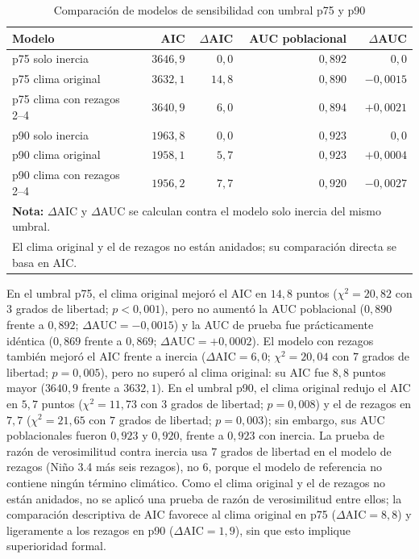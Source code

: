 \documentclass[11pt,a4paper]{article}
\begin{document}
\begin{table}[htbp]
	\centering
	\small
	\caption{Comparación de modelos de sensibilidad con umbral p75 y p90}
	\label{tab:sens_modelos}
	\begin{tabular}{lrrrr}
		\toprule
		\textbf{Modelo} & \textbf{AIC} & \textbf{$\Delta$AIC} & \textbf{AUC poblacional} & \textbf{$\Delta$AUC} \\
		\midrule
		p75 solo inercia & $3646{,}9$ & $0{,}0$ & $0{,}892$ & $0{,}0$ \\
		p75 clima original & $3632{,}1$ & $14{,}8$ & $0{,}890$ & $-0{,}0015$ \\
		p75 clima con rezagos 2--4 & $3640{,}9$ & $6{,}0$ & $0{,}894$ & $+0{,}0021$ \\
		\midrule
		p90 solo inercia & $1963{,}8$ & $0{,}0$ & $0{,}923$ & $0{,}0$ \\
		p90 clima original & $1958{,}1$ & $5{,}7$ & $0{,}923$ & $+0{,}0004$ \\
		p90 clima con rezagos 2--4 & $1956{,}2$ & $7{,}7$ & $0{,}920$ & $-0{,}0027$ \\
		\midrule
		\multicolumn{5}{l}{\textbf{Nota:} $\Delta$AIC y $\Delta$AUC se calculan contra el modelo solo inercia del mismo umbral.} \\
		\multicolumn{5}{l}{El clima original y el de rezagos no están anidados; su comparación directa se basa en AIC.} \\
		\bottomrule
	\end{tabular}
\end{table}

En el umbral p75, el clima original mejoró el AIC en $14{,}8$ puntos ($\chi^2 = 20{,}82$ con $3$ grados de libertad; $p < 0{,}001$), pero no aumentó la AUC poblacional ($0{,}890$ frente a $0{,}892$; $\Delta\text{AUC} = -0{,}0015$) y la AUC de prueba fue prácticamente idéntica ($0{,}869$ frente a $0{,}869$; $\Delta\text{AUC} = +0{,}0002$). El modelo con rezagos también mejoró el AIC frente a inercia ($\Delta\text{AIC} = 6{,}0$; $\chi^2 = 20{,}04$ con $7$ grados de libertad; $p = 0{,}005$), pero no superó al clima original: su AIC fue $8{,}8$ puntos mayor ($3640{,}9$ frente a $3632{,}1$). En el umbral p90, el clima original redujo el AIC en $5{,}7$ puntos ($\chi^2 = 11{,}73$ con $3$ grados de libertad; $p = 0{,}008$) y el de rezagos en $7{,}7$ ($\chi^2 = 21{,}65$ con $7$ grados de libertad; $p = 0{,}003$); sin embargo, sus AUC poblacionales fueron $0{,}923$ y $0{,}920$, frente a $0{,}923$ con inercia. La prueba de razón de verosimilitud contra inercia usa $7$ grados de libertad en el modelo de rezagos (Niño 3.4 más seis rezagos), no $6$, porque el modelo de referencia no contiene ningún término climático. Como el clima original y el de rezagos no están anidados, no se aplicó una prueba de razón de verosimilitud entre ellos; la comparación descriptiva de AIC favorece al clima original en p75 ($\Delta\text{AIC} = 8{,}8$) y ligeramente a los rezagos en p90 ($\Delta\text{AIC} = 1{,}9$), sin que esto implique superioridad formal.
\end{document}
